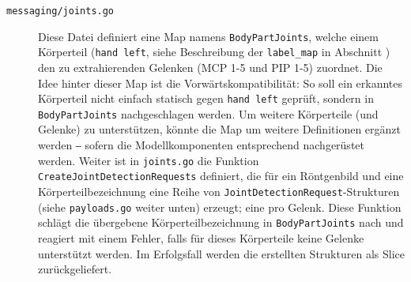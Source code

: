 \begin{description}
    \item[\texttt{messaging/joints.go}] Diese Datei definiert eine Map namens \texttt{BodyPartJoints}, welche einem Körperteil (\texttt{hand left}, siehe Beschreibung der \texttt{label\_map} in Abschnitt ) den zu extrahierenden Gelenken (MCP 1-5 und PIP 1-5) zuordnet. Die Idee hinter dieser Map ist die Vorwärtskompatibilität: So soll ein erkanntes Körperteil nicht einfach statisch gegen \texttt{hand left} geprüft, sondern in \texttt{BodyPartJoints} nachgeschlagen werden. Um weitere Körperteile (und Gelenke) zu unterstützen, könnte die Map um weitere Definitionen ergänzt werden ‒ sofern die Modellkomponenten entsprechend nachgerüstet werden. Weiter ist in \texttt{joints.go} die Funktion \texttt{CreateJointDetectionRequests} definiert, die für ein Röntgenbild und eine Körperteilbezeichnung eine Reihe von \texttt{JointDetectionRequest}-Strukturen (siehe \texttt{payloads.go} weiter unten) erzeugt; eine pro Gelenk. Diese Funktion schlägt die übergebene Körperteilbezeichnung in \texttt{BodyPartJoints} nach und reagiert mit einem Fehler, falls für dieses Körperteile keine Gelenke unterstützt werden. Im Erfolgsfall werden die erstellten Strukturen als Slice zurückgeliefert.

\end{description}
